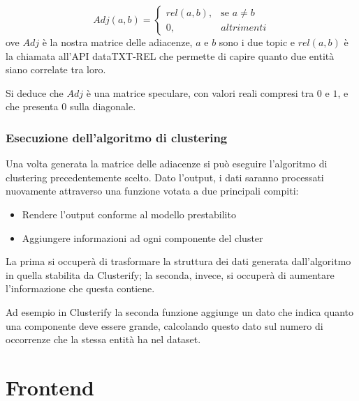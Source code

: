 			\begin{equation*}
				Adj(a, b) = \begin{cases} 
					rel(a,b), & \mbox{se } a \neq b \\ 
					0, & altrimenti 
				\end{cases}
			\end{equation*}
			ove $Adj$ è la nostra matrice delle adiacenze, $a$ e $b$ sono i due topic e $rel(a,b)$ è la chiamata all'API dataTXT-REL che permette di capire quanto due entità siano correlate tra loro.
			
			Si deduce che $Adj$ è una matrice speculare, con valori reali compresi tra $0$ e $1$, e che presenta $0$ sulla diagonale.

		\subsubsection{Esecuzione dell'algoritmo di clustering}
			Una volta generata la matrice delle adiacenze si può eseguire l'algoritmo di clustering precedentemente scelto. Dato l'output, i dati saranno processati nuovamente attraverso una funzione votata a due principali compiti:
			\begin{itemize}
  				\item Rendere l'output conforme al modello prestabilito
	  			\item Aggiungere informazioni ad ogni componente del cluster
 			\end{itemize} 
			
			La prima si occuperà di trasformare la struttura dei dati generata dall'algoritmo in quella stabilita da Clusterify; la seconda, invece, si occuperà di aumentare l'informazione che questa contiene.

			Ad esempio in Clusterify la seconda funzione aggiunge un dato che indica quanto una componente deve essere grande, calcolando questo dato sul numero di occorrenze che la stessa entità ha nel dataset.

\section{Frontend}
	
